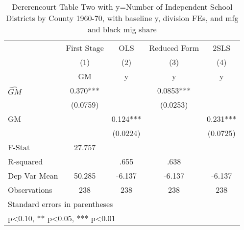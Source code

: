 \begin{table}[htbp]\centering
\def\sym#1{\ifmmode^{#1}\else\(^{#1}\)\fi}
\caption{Dererencourt Table Two with y=Number of Independent School Districts by County 1960-70, with baseline y, division FEs, and mfg and black mig share}
\begin{tabular}{l*{4}{c}}
\toprule
                    & First Stage   &         OLS   &Reduced Form   &        2SLS   \\
                    &\multicolumn{1}{c}{(1)}&\multicolumn{1}{c}{(2)}&\multicolumn{1}{c}{(3)}&\multicolumn{1}{c}{(4)}\\
                    &\multicolumn{1}{c}{GM}&\multicolumn{1}{c}{y}&\multicolumn{1}{c}{y}&\multicolumn{1}{c}{y}\\
\midrule
$\hat{GM}$          &       0.370***&               &      0.0853***&               \\
                    &    (0.0759)   &               &    (0.0253)   &               \\
\addlinespace
GM                  &               &       0.124***&               &       0.231***\\
                    &               &    (0.0224)   &               &    (0.0725)   \\
\midrule
F-Stat              &      27.757   &               &               &               \\
R-squared           &               &        .655   &        .638   &               \\
Dep Var Mean        &      50.285   &      -6.137   &      -6.137   &      -6.137   \\
Observations        &         238   &         238   &         238   &         238   \\
\bottomrule
\multicolumn{5}{l}{\footnotesize Standard errors in parentheses}\\
\multicolumn{5}{l}{\footnotesize * p<0.10, ** p<0.05, *** p<0.01}\\
\end{tabular}
\end{table}
